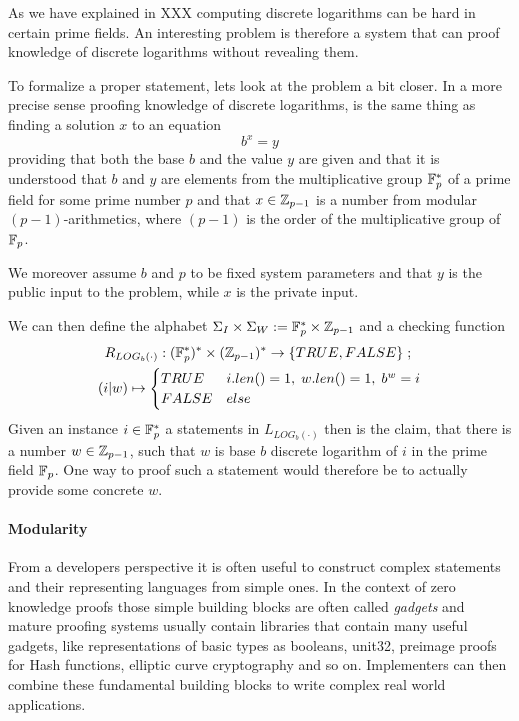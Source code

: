 \begin{example} As we have explained in XXX computing discrete logarithms can be hard in certain prime fields. An interesting problem is therefore a system that can proof knowledge of discrete logarithms without revealing them.

To formalize a proper statement, lets look at the problem a bit closer. In a more precise sense proofing knowledge of discrete logarithms, is the same thing as finding a solution $x$ to an equation
$$
b^x = y
$$ 
providing that both the base $b$ and the value $y$ are given and that it is understood that $b$ and $y$ are elements from the multiplicative group $\mathbb{F}_{p}^*$ of a prime field for some prime number $p$ and that $x\in \mathbb{Z}_{p-1}$ is a number from modular $(p-1)$-arithmetics, where $(p-1)$ is the order of the multiplicative group of $\mathbb{F}_p$.

We moreover assume $b$ and $p$ to be fixed system parameters and that $y$ is the public input to the problem, while $x$ is the private input. 

We can then define the alphabet $\Sigma_I \times \Sigma_W := \mathbb{F}_p^* \times \mathbb{Z}_{p-1}$ and a checking function
\begin{multline*}
R_{LOG_b(\cdot)} : (\mathbb{F}_p^*)^* \times (\mathbb{Z}_{p-1})^* \to \{TRUE, FALSE\}\;;\;\\
(i|w) \mapsto
\begin{cases}
TRUE & i.len()=1,\; w.len()=1,\; b^w = i\\
FALSE & else
\end{cases}
\end{multline*}
Given an instance $i\in \mathbb{F}_p^*$ a statements in $L_{LOG_b(\cdot)}$ then is the claim, that there is a number $w\in \mathbb{Z}_{p-1}$, such that $w$ is base $b$ discrete logarithm of $i$ in the prime field $\mathbb{F}_p$. One way to proof such a statement would therefore be to actually provide some concrete $w$. 
\end{example}
\paragraph{Modularity} From a developers perspective it is often useful to construct complex statements and their representing languages from simple ones. In the context of zero knowledge proofs those simple building blocks are often called \textit{gadgets} and mature proofing systems usually contain libraries that contain many useful gadgets, like representations of basic types as booleans, unit32, preimage proofs for Hash functions, elliptic curve cryptography and so on. Implementers can then combine these fundamental building blocks to write complex real world applications. 

